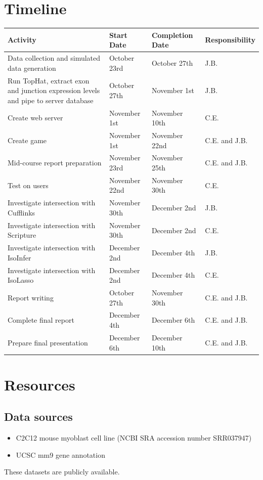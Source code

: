\documentclass[12pt]{article}
\begin{document}
\section{Timeline}
\begin{tabularx}{\linewidth}{X || l || l || X}
\textbf{Activity} & \textbf{Start Date} & \textbf{Completion Date} & \textbf{Responsibility} \\
\hline
Data collection and simulated data generation & October 23rd & October 27th & J.B. \\
\hline
Run TopHat, extract exon and junction expression levels and pipe to server database & October 27th & November 1st & J.B. \\
\hline
Create web server & November 1st & November 10th & C.E. \\
\hline
Create game & November 1st & November 22nd & C.E. and J.B. \\
\hline
Mid-course report preparation & November 23rd & November 25th & C.E. and J.B. \\
\hline
Test on users & November 22nd & November 30th & C.E. \\
\hline
Investigate intersection with Cufflinks & November 30th & December 2nd & J.B. \\
\hline
Investigate intersection with Scripture & November 30th & December 2nd & C.E. \\
\hline
Investigate intersection with IsoInfer & December 2nd & December 4th & J.B. \\
\hline
Investigate intersection with IsoLasso & December 2nd & December 4th & C.E. \\
\hline
Report writing & October 27th & November 30th & C.E. and J.B. \\
\hline
Complete final report & December 4th & December 6th & C.E. and J.B. \\
\hline
Prepare final presentation & December 6th & December 10th & C.E. and J.B. \\
\end{tabularx}

\section*{Resources}
\subsection*{Data sources}
\begin{itemize}
\item C2C12 mouse myoblast cell line (NCBI SRA accession number SRR037947) \citep{trapnell2010transcript}
\item UCSC mm9 gene annotation \citep{karolchik2008ucsc}
\end{itemize}
These datasets are publicly available.
\end{document}
